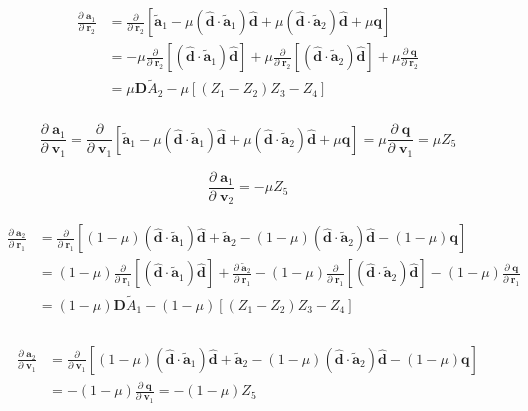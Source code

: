 \documentclass[]{article}
\newcommand{\pd}[2]{\frac{\partial\;#1}{\partial\;#2}}
\newcommand{\pddown}[2]{\frac{\partial}{\partial\;#2} \left[ #1 \right] }
\begin{document}
	\begin{align*}
	\begin{split}
		\pd{\mathbf{a}_1}{\mathbf{r}_2} &= \pddown{\tilde{\mathbf{a}}_1 - \mu  (\hat{\mathbf{d}} \cdot \tilde{\mathbf{a}}_1) \hat{\mathbf{d}} + \mu  (\hat{\mathbf{d}}\cdot  \tilde{\mathbf{a}}_2) \hat{\mathbf{d}} + \mu \mathbf{q}}{\mathbf{r}_2} \\ &= - \mu \pddown{  (\hat{\mathbf{d}} \cdot \tilde{\mathbf{a}}_1) \hat{\mathbf{d}}}{\mathbf{r}_2} + \mu \pddown{  (\hat{\mathbf{d}}\cdot  \tilde{\mathbf{a}}_2) \hat{\mathbf{d}}}{\mathbf{r}_2} + \mu \pd{\mathbf{q}}{\mathbf{r}_2} \\ &= \mu \mathbf{D} \tilde{A}_2 - \mu [(Z_1 - Z_2) Z_3 - Z_4] \\
	\end{split}
	\end{align*}

	\begin{equation*}
		\pd{\mathbf{a}_1}{\mathbf{v}_1} = \pddown{\tilde{\mathbf{a}}_1 - \mu  (\hat{\mathbf{d}} \cdot \tilde{\mathbf{a}}_1) \hat{\mathbf{d}} + \mu  (\hat{\mathbf{d}}\cdot  \tilde{\mathbf{a}}_2) \hat{\mathbf{d}} + \mu \mathbf{q}}{\mathbf{v}_1} = \mu \pd{\mathbf{q}}{\mathbf{v}_1} = \mu Z_5
	\end{equation*}

	\begin{equation*}
		\pd{\mathbf{a}_1}{\mathbf{v}_2} = -\mu Z_5
	\end{equation*}

	\begin{align*}
	\begin{split}
		\pd{\mathbf{a}_2}{\mathbf{r}_1}
		&= \pddown{(1 - \mu) (\hat{\mathbf{d}} \cdot \tilde{\mathbf{a}}_1) \hat{\mathbf{d}} + \tilde{\mathbf{a}}_2 - (1 - \mu) (\hat{\mathbf{d}}\cdot  \tilde{\mathbf{a}}_2) \hat{\mathbf{d}} - (1-\mu) \mathbf{q}}{\mathbf{r}_1} \\
		&= (1 - \mu) \pddown{(\hat{\mathbf{d}} \cdot \tilde{\mathbf{a}}_1) \hat{\mathbf{d}}}{\mathbf{r}_1} + \pd{\tilde{\mathbf{a}}_2}{\mathbf{r}_1} - (1 - \mu) \pddown{(\hat{\mathbf{d}}\cdot  \tilde{\mathbf{a}}_2) \hat{\mathbf{d}}}{\mathbf{r}_1} - (1-\mu) \pd{\mathbf{q}}{\mathbf{r}_1} \\
		&= (1 - \mu) \mathbf{D} \tilde{A}_1 - (1 - \mu) [(Z_1 - Z_2) Z_3 - Z_4] \\
	\end{split}
	\end{align*}

	\begin{align*}
	\begin{split}
		\pd{\mathbf{a}_2}{\mathbf{v}_1}
		&= \pddown{(1 - \mu) (\hat{\mathbf{d}} \cdot \tilde{\mathbf{a}}_1) \hat{\mathbf{d}} + \tilde{\mathbf{a}}_2 - (1 - \mu) (\hat{\mathbf{d}}\cdot  \tilde{\mathbf{a}}_2) \hat{\mathbf{d}} - (1-\mu) \mathbf{q}}{\mathbf{v}_1} \\
		&= - (1-\mu) \pd{\mathbf{q}}{\mathbf{v}_1} = - (1-\mu) Z_5 \\
	\end{split}
	\end{align*}
\end{document}
